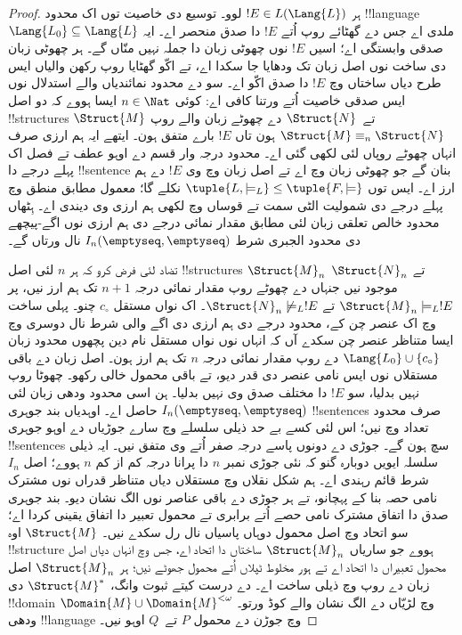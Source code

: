 \documentclass[../../../include/open-logic-section]{subfiles}
\begin{document}
\begin{proof}
ہر $!E \in L(\Lang{L})$ لوو۔ توسیع دی خاصیت توں اک
محدود !!{language} $\Lang{L_0}\subseteq\Lang{L}$ ملدی اے
جس دے گھٹائے روپ اُتے $!E$ دا صدق منحصر اے۔ ایہ صدقی وابستگی
اے؛ اسیں $!E$ نوں چھوٹی زبان دا جملہ نہیں منّاں گے۔ ہر چھوٹی
زبان دی ساخت نوں اصل زبان تک ودھایا جا سکدا اے، تے اکّو گھٹایا
روپ رکھن والیاں ایس طرح دیاں ساختاں وچ $!E$ دا صدق اکّو اے۔
سو  دے محدود نمائندیاں والے استدلال نوں
ایس صدقی خاصیت اُتے ورتنا کافی اے: کوئی $n\in\Nat$ ایسا ہووے
کہ دو اصل !!{structure}s $\Struct{M}$ تے~$\Struct{N}$ دے
چھوٹے زبان والے روپ $\Struct{M}\equiv_n\Struct{N}$ ہون
تاں $!E$ بارے متفق ہون۔ ایتھے ایہ ہم ارزی صرف انہاں چھوٹے
روپاں لئی لکھی گئی اے۔ محدود درجہ وار قسم دے اوہو عطف تے فصل
اک پہلے درجے دا !!{sentence} بنان گے جو چھوٹی زبان وچ اے
تے اصل زبان وچ وی $!E$ دے ہم ارز اے۔ ایس توں
$\tuple{L, \models_L} \le \tuple{F, \models}$ نکلے گا؛
معمول مطابق منطق وچ پہلے درجے دی شمولیت الٹی سمت تے قوساں وچ
لکھی ہم ارزی وی دیندی اے۔ ہِٹھاں محدود خالص تعلقی زبان لئی
 مطابق مقدار نمائی درجے دی ہم ارزی نوں
اگے-پیچھے دی محدود الجبری شرط $I_n(\emptyseq,\emptyseq)$
نال ورتاں گے۔

تضاد لئی فرض کرو کہ ہر $n$ لئی اصل !!{structure}s
$\Struct{M}_n$ تے $\Struct{N}_n$ موجود نیں جنہاں دے
چھوٹے روپ مقدار نمائی درجہ $n+1$ تک ہم ارز نیں، پر
$\Struct{M}_n\models_L !E$ تے
$\Struct{N}_n\not\models_L !E$۔ اک نواں مستقل $c_\circ$
چنو۔ پہلی ساخت وچ اک عنصر چن کے، محدود درجے دی ہم ارزی دی
اگے والی شرط نال دوسری وچ ایسا متناظر عنصر چن سکدے آں کہ
انہاں نوں نواں مستقل نام دین پچھوں محدود زبان
$\Lang{L_0}\cup\{c_\circ\}$ دے روپ مقدار نمائی درجہ $n$ تک ہم ارز
ہون۔ اصل زبان دے باقی مستقلاں نوں ایس نامی عنصر دی قدر دیو،
تے باقی محمول خالی رکھو۔ چھوٹا روپ نہیں بدلیا، سو $!E$ دا
مختلف صدق وی نہیں بدلیا۔ ہن اسی محدود ودھی زبان لئی
$I_n(\emptyseq,\emptyseq)$ حاصل اے۔ اوہدیاں بند جوہری
!!{sentence}s صرف محدود تعداد وچ نیں؛ اس لئی کسے بے حد
ذیلی سلسلے وچ سارے جوڑیاں دے اوہو جوہری !!{sentence}s سچ ہون گے۔ جوڑی
دے دونوں پاسے درجہ صفر اُتے وی متفق نیں۔ ایہ ذیلی سلسلہ
ایویں دوبارہ گنو کہ نئی جوڑی نمبر $n$ دا پرانا درجہ کم از کم
$n$ ہووے؛ اصل $I_n$ شرط قائم رہندی اے۔ ہم شکل نقلاں وچ
مستقلاں دیاں متناظر قدراں نوں مشترک نامی حصہ بنا کے پہچانو،
تے ہر جوڑی دے باقی عناصر نوں الگ نشان دیو۔ بند جوہری صدق دا
اتفاق مشترک نامی حصے اُتے برابری تے محمول تعبیر دا اتفاق یقینی
کردا اے؛ سو اتحاد وچ اصل محمول دوہاں پاسیاں نال رل سکدے نیں۔
$\Struct{M}$ اوہ !!{structure} ہووے جو ساریاں $\Struct{M}_n$ ساختاں دا اتحاد اے،
جس وچ انہاں دیاں اصل محمول تعبیراں دا اتحاد اے تے ہور مخلوط
ٹپلاں اُتے محمول جھوٹے نیں؛ ہر $\Struct{M}_n$ اصل زبان
دے روپ وچ ذیلی ساخت اے۔ 
دے درست کیتے ثبوت وانگ، $\Struct{M}^*$ دی
!!{domain} $\Domain{M}\cup\Domain{M}^{<\omega}$ وچ
لڑیّاں دے الگ نشان والے کوڈ ورتو۔ ودھی !!{language} وچ
جوڑن دے محمول $P$ تے~$Q$ اوہو نیں۔


\end{proof}
\end{document}
